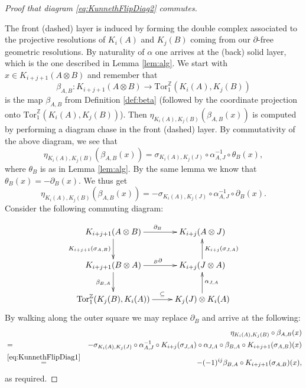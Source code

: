 \documentclass[a4paper,10pt]{amsart}
\numberwithin{equation}{section}
\numberwithin{theorem}{section}
\newcommand{\Z}{\mathbb{Z}}
\newcommand{\Tor}{\mathrm{Tor}_1^{\Z}}
\begin{document}
\begin{proof}[Proof that diagram \eqref{eq:KunnethFlipDiag2} commutes]
\begin{landscape}
	\end{landscape}
	 	 
	The front (dashed) layer is induced by forming the double complex associated to the projective resolutions of $K_i(A)$ and $K_j(B)$ coming from our $\partial$-free geometric resolutions. By  naturality of $\alpha$ one arrives at the (back) solid layer, which is the one described in Lemma \ref{lem:alg}. We start with $x \in K_{i+j+1}(A \otimes B)$ and remember that 
	$$
		\beta_{A,B} \colon K_{i+j+1}(A \otimes B) \to \Tor(K_i(A),K_j(B))
	$$
	is the map $\beta_{A,B}$ from Definition \ref{def:beta} (followed by the coordinate projection onto $\Tor(K_i(A),K_j(B))$). Then $\eta_{K_i(A),K_j(B)}(\beta_{A,B}(x))$ is computed by performing a diagram chase in the front (dashed) layer. By commutativity of the above diagram, we see that 
	 $$
	 	\eta_{K_i(A),K_j(B)}(\beta_{A,B}(x)) = \sigma_{K_i(A),K_j(J)} \circ \alpha_{A,J}^{-1} \circ \theta_B(x),
	 $$
	 where $\theta_B$ is as in Lemma \ref{lem:alg}. By the same lemma we know that $\theta_B(x) = -\partial_B(x)$. We thus get 
	 \[
	 	\eta_{K_i(A),K_j(B)}(\beta_{A,B}(x)) = -  \sigma_{K_i(A),K_j(J)} \circ \alpha_{A,J}^{-1} \circ \partial_B(x).
	 \]
	Consider the following commuting diagram:
	
	\[
		\xymatrix{
			K_{i+j+1}(A \otimes B) \ar[r]^{\partial_B} \ar[d]_{K_{i+j+1}(\sigma_{A,B})} & K_{i+j}(A \otimes J) \\
			K_{i+j+1}(B \otimes A) \ar[r]^{{}_B \partial} \ar[d]_{\beta_{B,A}} & K_{i+j}(J \otimes A) \ar[u]_{K_{i+j}(\sigma_{J,A})}  \\
			\Tor(K_j(B),K_i(A)) \ar[r]^-{\subseteq} & K_j(J) \otimes K_i(A) \ar[u]_{\alpha_{J,A}} 
		}
	\] 
	By walking along the outer square we may replace $\partial_B$ and arrive at the following:
	\begin{eqnarray*}
		&& \hspace*{-3em} \eta_{K_i(A),K_j(B)} \circ \beta_{A,B}(x) \\ 
		&=& - \sigma_{K_i(A),K_j(J)} \circ \alpha_{A,J}^{-1} \circ K_{i+j}(\sigma_{J,A}) \circ \alpha_{J,A}  \circ \beta_{B,A} \circ K_{i+j+1}(\sigma_{A,B})(x) \\
		&\stackrel{\eqref{eq:KunnethFlipDiag1}}=& -(-1)^{ij}\beta_{B,A}\circ K_{i+j+1}(\sigma_{A,B})(x),
	\end{eqnarray*}
	as required.
\end{proof}
\end{document}
